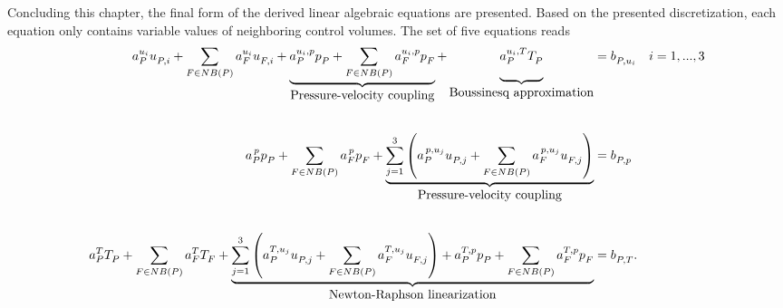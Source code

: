 Concluding this chapter, the final form of the derived linear algebraic equations are presented. Based on the presented discretization, each equation only contains variable values of neighboring control volumes. The set of five equations reads
\begin{align*}
  a_P^{u_i} u_{P,i}^{\vphantom{u_i}}
  + \sum_{F \in NB(P)} a_F^{u_i} u_{F,i}^{\vphantom{u_i}} 
  + \underbrace{\vphantom{\sum_F}{a_P^{u_i,p} p_P^{\vphantom{u_i,p}}
  + \sum_{F \in NB(P)} a_F^{u_i,p} p_F^{\vphantom{u_i,p}}}}_{\hbox{Pressure-velocity coupling}} 
  + \underbrace{\vphantom{\sum_F}{ a_P^{u_i,T} T_P^{\vphantom{u_i,T}}}}_{\hbox{Boussinesq approximation}} 
  &= b_{P,u_i}^{\vphantom{u_i,T}} \quad i=1,...,3  \\[2.0em]
  a_P^{\, p} p_{P}^{\vphantom{p}} 
  + \sum_{F \in NB(P)} a_F^{\,p} p_F^{\vphantom{\,p}} 
  + \underbrace{ \sum_{j=1}^3 \left(a_P^{\,p,u_j} u_{P,j}^{\vphantom{p,u_j}}
  + \sum_{F \in NB(P)} a_F^{\, p,u_j} u_{F,j}^{\vphantom{p,u_j}} \right)}_{\hbox{Pressure-velocity coupling}} 
  &= b_{P,p}^{\vphantom{p,u_j}}  \\[2.0em]
  a_P^{T} T_{P}^{\vphantom{T}} 
  + \sum_{F \in NB(P)} a_F^{T} T_F^{\vphantom{T}} 
  + \underbrace{\sum_{j=1}^3 \left(a_P^{T,u_j} u_{P,j}^{\vphantom{T,u_j}}
  + \sum_{F \in NB(P)} a_F^{T,u_j} u_{F,j}^{\vphantom{T,u_j}} \right) 
  + a_P^{T,p} p_P^{\vphantom{T,p}} 
+ \sum_{F \in NB(P) } a_F^{T,p} p_F^{\vphantom{T,p}}}_{\hbox{Newton-Raphson linearization}} 
  &= b_{P,T}^{\vphantom{T,p}}.
\end{align*}

